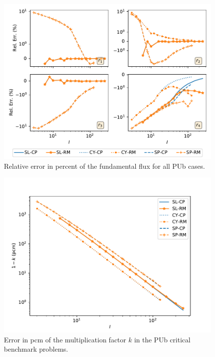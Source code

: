 \documentclass{ictt26}
\providecommand{\DIFdelbegin}{} %
\providecommand{\DIFaddbeginFL}{} %
\providecommand{\DIFaddendFL}{} %
\providecommand{\DIFdelendFL}{} %
\newcommand{\DIFscaledelfig}{0.5}
\newlength{\DIFdelgraphicswidth} %
\newlength{\DIFdelgraphicsheight} %
\newcommand{\DIFaddincludegraphics}[2][]{{\color{blue}\fbox{\DIFOincludegraphics[#1]{#2}}}} %
\newcommand{\DIFdelincludegraphics}[2][]{%
\sbox{\DIFdelgraphicsbox}{\DIFOincludegraphics[#1]{#2}}%
\settoboxwidth{\DIFdelgraphicswidth}{\DIFdelgraphicsbox} %
\settoboxtotalheight{\DIFdelgraphicsheight}{\DIFdelgraphicsbox} %
\scalebox{\DIFscaledelfig}{%
\parbox[b]{\DIFdelgraphicswidth}{\usebox{\DIFdelgraphicsbox}\\[-\baselineskip] \rule{\DIFdelgraphicswidth}{0em}}\llap{\resizebox{\DIFdelgraphicswidth}{\DIFdelgraphicsheight}{%
\setlength{\unitlength}{\DIFdelgraphicswidth}%
\begin{picture}(1,1)%
\thicklines\linethickness{2pt} %
{\color[rgb]{1,0,0}\put(0,0){\framebox(1,1){}}}%
{\color[rgb]{1,0,0}\put(0,0){\line( 1,1){1}}}%
{\color[rgb]{1,0,0}\put(0,1){\line(1,-1){1}}}%
\end{picture}%
}\hspace*{3pt}}} %
} %
\DeclareRobustCommand{\DIFdelbegin}{\DIFOdelbegin \let\includegraphics\DIFdelincludegraphics} %
\DeclareRobustCommand{\DIFaddbeginFL}{\DIFOaddbeginFL \let\includegraphics\DIFaddincludegraphics} %
\DeclareRobustCommand{\DIFaddendFL}{\DIFOaddendFL \let\includegraphics\DIFOincludegraphics} %
\DeclareRobustCommand{\DIFdelendFL}{\DIFOaddendFL \let\includegraphics\DIFOincludegraphics} %
\begin{document}
\DIFdelbegin %
\DIFdelendFL \DIFaddbeginFL \begin{figure}[htbp]
\DIFaddendFL \centering
\includegraphics[width=.8\linewidth]{cpm_PUb_flxerr.pdf}
\caption{Relative error in percent of the fundamental flux for all PUb cases.}
\label{fig:cpm_PUb_flxerr}
\end{figure}
\DIFdelbegin %

\DIFdelendFL %
\DIFaddbeginFL \begin{figure}[hbtp]
\DIFaddendFL \centering
\includegraphics[width=.8\linewidth]{cpm_PUb_kerr.pdf}
\caption{Error in pcm of the multiplication factor $k$ in the PUb critical benchmark problems.}
\label{fig:cpm_PUb_kerr}
\end{figure}
\end{document}
